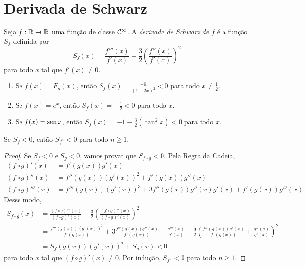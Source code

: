 \section{Derivada de Schwarz}

\begin{definition}
Seja $f: \mathbb{R} \to \mathbb{R}$ uma função de classe $\mathcal{C}^\infty$.  A \textit{derivada de Schwarz de $f$} é a função $S_f$ definida por
$$S_f(x) = \frac{f'''(x)}{f'(x)} - \frac{3}{2} \left( \frac{f''(x)}{f'(x)} \right)^2$$
para todo $x$ tal que $f'(x) \neq 0$.

\end{definition}

\begin{example}

\begin{enumerate}
\item Se $f(x) = F_{\mu}(x)$, então $S_f(x)  = \frac{-6}{(1-2x)^2} < 0$ para todo $x \neq \frac{1}{2}$.
\item Se $f(x) = e^x$, então $S_f(x) = -\frac{1}{2} < 0$ para todo $x$.
\item Se $f(x) = \operatorname{sen} x$, então $S_f(x) = -1 -\frac{3}{2}(\tan^2 x) < 0$ para todo $x$.
\end{enumerate}
\end{example}

\begin{lemma}
Se $S_f < 0$, então $S_{f^n} < 0$ para todo $n \geq 1$.
\end{lemma}

\begin{proof}
Se $S_f < 0$ e $S_g < 0$, vamos provar que $S_{f \circ g} < 0$. Pela Regra da Cadeia,
\begin{align*}
(f \circ g)'(x) & = f'(g(x))g'(x) \\
(f \circ g)''(x) & = f''(g(x))(g'(x))^2 + f'(g(x))g''(x) \\
(f \circ g)'''(x) & = f'''(g(x))(g'(x))^3 + 3f''(g(x))g''(x)g'(x) + f'(g(x))g'''(x)
\end{align*}
Desse modo,
\begin{align*}
S_{f \circ g}(x) & = \frac{(f \circ g)'''(x)}{(f \circ g)'(x)} - \frac{3}{2} \left( \frac{(f \circ g)''(x)}{(f \circ g)'(x)} \right)^2 \\
& = \frac{f'''(g(x))(g'(x))^2}{f'(g(x))} + 3\frac{f''(g(x))g''(x)}{f'(g(x))} + \frac{g'''(x)}{g'(x)} - \frac{3}{2}\left( \frac{f''(g(x))g'(x)}{f'(g(x))} + \frac{g''(x)}{g'(x)} \right)^2 \\
& = S_f(g(x)) (g'(x))^2 + S_g(x) < 0
\end{align*}
para todo $x$ tal que $(f \circ g)'(x) \neq 0$. Por indução, $S_{f^n} < 0$ para todo $n \geq 1$.
\end{proof}

